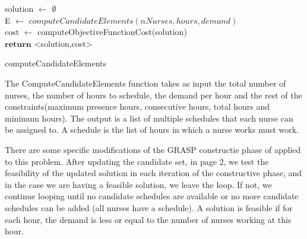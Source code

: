 \begin{algorithm}[H]


solution $\leftarrow$ $\emptyset$ \\
E $\leftarrow$ $computeCandidateElements(nNurses, hours, demand)$ \\
cost $\leftarrow$ computeObjectiveFunctionCost(solution)\\
$\textbf{return}$ <solution,cost>
\caption{computeCandidateElements}\label{alg.mainLoop}
\end{algorithm}


The ComputeCandidateElements function takes as input the total number of nurses, the number of hours to schedule, the demand per hour and the rest of the constraints(maximum presence hours, consecutive hours, total hours and minimum hours). The output is a list of multiple schedules that each nurse can be assigned to. A schedule is the list of hours in which a nurse works must work.




There are some specific modifications of the GRASP constructie phase of \cite{grasp} applied to this problem. After updating the candidate set, in \cite{grasp} page 2, we test the feasibility of the updated solution in each iteration of the constructive phase, and in the case we are having a feasible solution, we leave the loop. If not, we continue looping until no candidate schedules are available or no more candidate schedules can be added (all nurses have a schedule). A solution is feasible if for each hour, the demand is less or equal to the number of nurses working at this hour.
 
